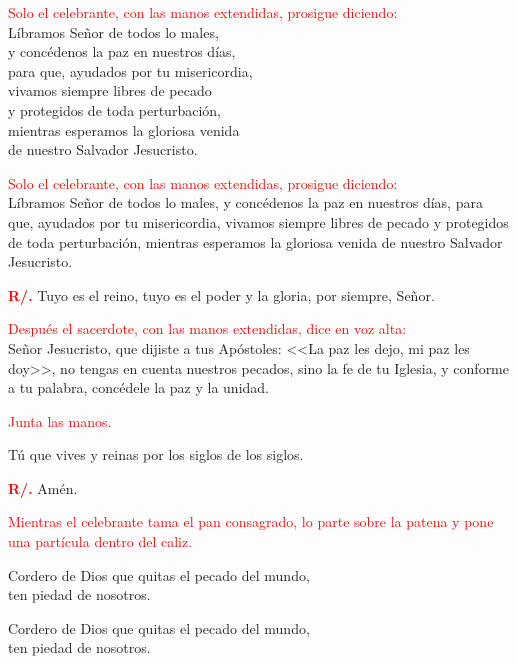 \documentclass[12pt, letterpaper, spanish]{article}
\begin{document}
  \large{\textcolor{red}{Solo el celebrante, con las manos extendidas, prosigue diciendo:}}\\
  \Large L\'ibramos Se\~nor de todos lo males,\\ 
  y conc\'edenos la paz en nuestros d\'ias,\\ 
  para que, ayudados por tu misericordia,\\ 
  vivamos siempre libres de pecado\\ 
  y protegidos de toda perturbaci\'on,\\ 
  mientras esperamos la gloriosa venida\\ 
  de nuestro Salvador Jesucristo.

  \large{\textcolor{red}{Solo el celebrante, con las manos extendidas, prosigue diciendo:}}\\
  \Large L\'ibramos Se\~nor de todos lo males, y conc\'edenos la paz en nuestros d\'ias, para que, ayudados por tu misericordia, vivamos siempre libres de pecado y protegidos de toda perturbaci\'on, mientras esperamos la gloriosa venida de nuestro Salvador Jesucristo.

  \noindent
  \Large {\bfseries \textcolor{red}{R/.}} \hspace{0.5cm} Tuyo es el reino, tuyo es el poder y la gloria, por siempre, Se\~nor.

  \large{\textcolor{red}{Despu\'es el sacerdote, con las manos extendidas, dice en voz alta:}}\\
  \Large Se\~nor Jesucristo, que dijiste a tus Ap\'ostoles: <<La paz les dejo, mi paz les doy>>, no tengas en cuenta nuestros pecados, sino la fe de tu Iglesia, y conforme a tu palabra, conc\'edele la paz y la unidad.

  \large{\textcolor{red}{Junta las manos.}}

  \noindent
  \Large T\'u que vives y reinas por los siglos de los siglos.

  \noindent
  \Large {\bfseries \textcolor{red}{R/.}} \hspace{0.5cm} Am\'en.

  \large{\textcolor{red}{Mientras el celebrante tama el pan consagrado, lo parte sobre la patena y pone una part\'icula dentro del caliz.}}

  \noindent
  \Large Cordero de Dios que quitas el pecado del mundo,\\
  ten piedad de nosotros.

  \noindent
  \Large Cordero de Dios que quitas el pecado del mundo,\\ 
  ten piedad de nosotros.
\end{document}
